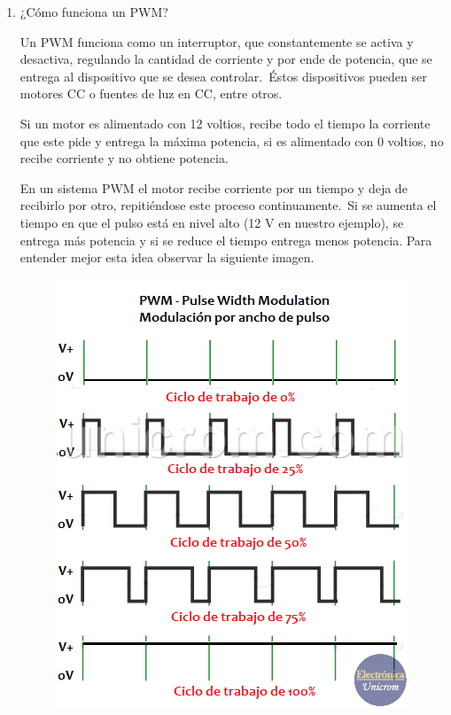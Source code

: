 \documentclass[12pt]{article}
\begin{document}
\begin{enumerate}
	\item \textcolor[HTML]{0066B3}{¿Cómo funciona un PWM?}\par

Un PWM funciona como un interruptor, que constantemente se activa y desactiva, regulando la cantidad de corriente y por ende de potencia, que se entrega al dispositivo que se desea controlar. Éstos dispositivos pueden ser motores CC o fuentes de luz en CC, entre otros.\par

Si un motor es alimentado con 12 voltios, recibe todo el tiempo la corriente que este pide y entrega la máxima potencia, si es alimentado con 0 voltios, no recibe corriente y no obtiene potencia.\par

En un sistema PWM el motor recibe corriente por un tiempo y deja de recibirlo por otro, repitiéndose este proceso continuamente. Si se aumenta el tiempo en que el pulso está en nivel alto (12 V en nuestro ejemplo), se entrega más potencia y si se reduce el tiempo entrega menos potencia. Para entender mejor esta idea observar la siguiente imagen.\par




\begin{figure}[H]
	\begin{Center}
		\includegraphics[width=4.15in,height=5.04in]{./media/image2.png}
	\end{Center}
\end{figure}



\end{enumerate}
\end{document}
